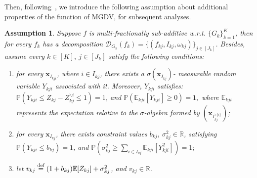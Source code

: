 \documentclass{article}
\def\sR{\mathbb{R}}
\def\vx{{\mathbf{x}}}
\def\eE{\mathbb{E}}
\def\pP{\mathbb{P}}
\def\defeq{\overset{\textup{def}}{=}}
\newtheorem{assumption}{Assumption}
\begin{document}
Then, following~\cite{ralaivola2015entropy}, we introduce the following assumption about additional properties of the function of MGDV, for subsequent analyses. 
    \begin{assumption}
    \label{thm:assump1}
        Suppose $f$ is multi-fractionally sub-additive w.r.t. $\{G_k\}_{k=1}^K$, 
        then for every $f_k$ has a decomposition $\mathcal{D}_{G_k}(f_k) = \{ (f_{kj}, I_{kj}, \omega_{kj}) \}_{j \in [J_k]}$. 
        Besides, assume every $k \in [K], ~ j \in [J_k]$ satisfy the following conditions: 
        \begin{enumerate}[(1)]
        \setlength\itemsep{-0.4pt}
            \item for every $\vx_{I_{kji}}$, where $i \in I_{kj}$, 
            there exists a $\sigma(\vx_{I_{kj}})$- measurable random variable $Y_{kji}$ associated with it. Moreover, 
            $Y_{kji}$ satisfies: $\pP (Y_{kji} \leq Z_{kj} - Z_{kj}^{\backslash{i}} \leq 1) = 1$, and $\pP \left( \eE_{kji}[Y_{kji}] \geq 0 \right) = 1,$
            where \(\eE_{kji}\) represents the expectation relative to the \(\sigma\)-algebra formed by \((\vx_{I_{kj}^{\backslash{\{i\}}}})\);
            \item for every $\vx_{I_{kj}}$, there exists constraint values $b_{kj},~\sigma_{kj}^2 \in \sR$,  satisfying $\pP (Y_{kji} \leq b_{kj}) = 1$, and $\pP \left( \sigma_{kj}^2 \geq \sum_{i \in I_{kj}} \eE_{kji}[Y_{kji}^2] \right) = 1;$
            \item let $v_{kj} \defeq (1 + b_{kj}) \eE[Z_{kj}] + \sigma_{kj}^2$, and $v_{kj} \in \sR$.
        \end{enumerate}
    \end{assumption}
\end{document}

